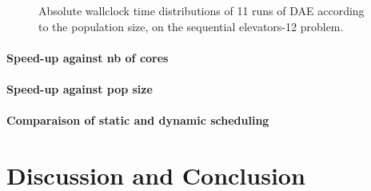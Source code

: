 \documentclass{sig-alternate}
\begin{document}
\begin{figure}[htpb]
  \begin{center}
    \hfill
  \end{center}
  \caption{Absolute wallclock time distributions of 11 runs of DAE according to
  the population size, on the sequential elevators-12 problem.}
  \label{fig:elevators_pop}
\end{figure}


\paragraph{Speed-up against nb of cores} %
\paragraph{Speed-up against pop size} %
\paragraph{Comparaison of static and dynamic scheduling} %

\section{Discussion and Conclusion}


%

%
%
\end{document}
